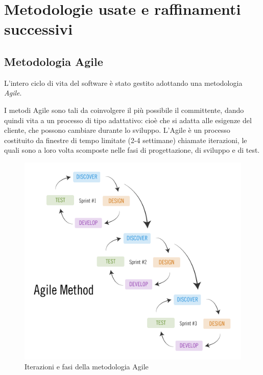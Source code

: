 \chapter{Metodologie usate e raffinamenti successivi}

\section{Metodologia Agile}

L'intero ciclo di vita del software è stato gestito adottando una metodologia \emph{Agile}.

I metodi Agile sono tali da coinvolgere il più possibile il committente, dando quindi vita a un processo di tipo adattativo: cioè che si adatta alle esigenze del cliente, che possono cambiare durante lo sviluppo.
L'Agile è un processo costituito da finestre di tempo limitate (2-4 settimane) chiamate iterazioni, le quali sono a loro volta scomposte nelle fasi di progettazione, di sviluppo e di test.

\begin{figure}[htbp]
\centering
\includegraphics[scale=0.6]{immagini/agile.png}
\caption{Iterazioni e fasi della metodologia Agile}
\end{figure}

